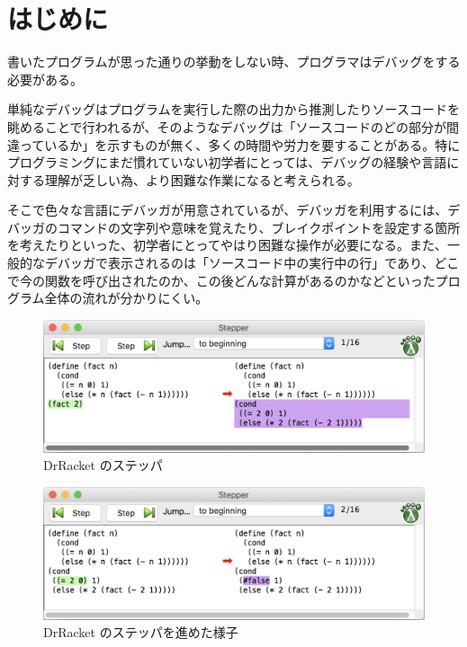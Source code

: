 \section{はじめに}

書いたプログラムが思った通りの挙動をしない時、プログラマはデバッグをする必要がある。

単純なデバッグはプログラムを実行した際の出力から推測したりソースコードを眺めることで行われるが、そのようなデバッグは「ソースコードのどの部分が間違っているか」を示すものが無く、多くの時間や労力を要することがある。特にプログラミングにまだ慣れていない初学者にとっては、デバッグの経験や言語に対する理解が乏しい為、より困難な作業になると考えられる。

そこで色々な言語にデバッガが用意されているが、デバッガを利用するには、デバッガのコマンドの文字列や意味を覚えたり、ブレイクポイントを設定する箇所を考えたりといった、初学者にとってやはり困難な操作が必要になる。また、一般的なデバッガで表示されるのは「ソースコード中の実行中の行」であり、どこで今の関数を呼び出されたのか、この後どんな計算があるのかなどといったプログラム全体の流れが分かりにくい。

\begin{figure}
  \begin{center}
    \includegraphics[width=13cm]{racket1.png}
  \end{center}
  \caption{DrRacket のステッパ}
  \label{figure:racket1}
\end{figure}

\begin{figure}
  \begin{center}
    \includegraphics[width=13cm]{racket2.png}
  \end{center}
  \caption{DrRacket のステッパを進めた様子}
  \label{figure:racket2}
\end{figure}


